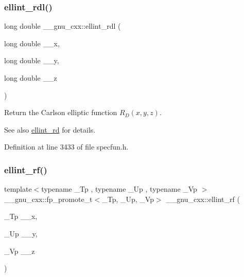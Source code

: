 \subsubsection{\texorpdfstring{ellint\+\_\+rdl()}{ellint\_rdl()}}
{\footnotesize\ttfamily long double \+\_\+\+\_\+gnu\+\_\+cxx\+::ellint\+\_\+rdl (\begin{DoxyParamCaption}\item[{long double}]{\+\_\+\+\_\+x,  }\item[{long double}]{\+\_\+\+\_\+y,  }\item[{long double}]{\+\_\+\+\_\+z }\end{DoxyParamCaption})\hspace{0.3cm}{\ttfamily [inline]}}

Return the Carlson elliptic function $ R_D(x,y,z) $.

\begin{DoxySeeAlso}{See also}
\hyperlink{group__gnu__math__spec__func_gad29dae6abc783c8fe952dba477e65309}{ellint\+\_\+rd} for details. 
\end{DoxySeeAlso}


Definition at line 3433 of file specfun.\+h.

\mbox{\label{group__gnu__math__spec__func_gae4859494464c7eaf98193f92b2235bc1}} 
\subsubsection{\texorpdfstring{ellint\+\_\+rf()}{ellint\_rf()}}
{\footnotesize\ttfamily template$<$typename \+\_\+\+Tp , typename \+\_\+\+Up , typename \+\_\+\+Vp $>$ \\
\+\_\+\+\_\+gnu\+\_\+cxx\+::fp\+\_\+promote\+\_\+t$<$\+\_\+\+Tp, \+\_\+\+Up, \+\_\+\+Vp$>$ \+\_\+\+\_\+gnu\+\_\+cxx\+::ellint\+\_\+rf (\begin{DoxyParamCaption}\item[{\+\_\+\+Tp}]{\+\_\+\+\_\+x,  }\item[{\+\_\+\+Up}]{\+\_\+\+\_\+y,  }\item[{\+\_\+\+Vp}]{\+\_\+\+\_\+z }\end{DoxyParamCaption})\hspace{0.3cm}{\ttfamily [inline]}}

